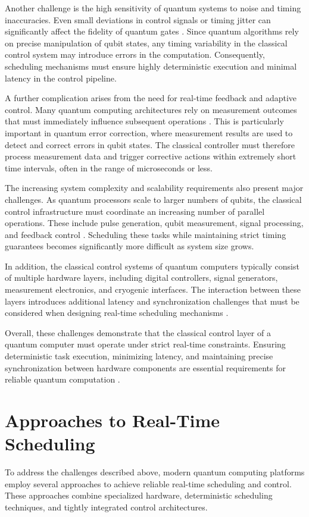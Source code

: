 \documentclass[12pt,a4paper]{article}
\begin{document}
Another challenge is the high sensitivity of quantum systems to noise and timing inaccuracies. Even small deviations in control signals or timing jitter can significantly affect the fidelity of quantum gates \cite{Salathé2018}. Since quantum algorithms rely on precise manipulation of qubit states, any timing variability in the classical control system may introduce errors in the computation. Consequently, scheduling mechanisms must ensure highly deterministic execution and minimal latency in the control pipeline.

A further complication arises from the need for real-time feedback and adaptive control. Many quantum computing architectures rely on measurement outcomes that must immediately influence subsequent operations \cite{Reuer2023}. This is particularly important in quantum error correction, where measurement results are used to detect and correct errors in qubit states. The classical controller must therefore process measurement data and trigger corrective actions within extremely short time intervals, often in the range of microseconds or less.

The increasing system complexity and scalability requirements also present major challenges. As quantum processors scale to larger numbers of qubits, the classical control infrastructure must coordinate an increasing number of parallel operations. These include pulse generation, qubit measurement, signal processing, and feedback control \cite{QPArch}. Scheduling these tasks while maintaining strict timing guarantees becomes significantly more difficult as system size grows.

In addition, the classical control systems of quantum computers typically consist of multiple hardware layers, including digital controllers, signal generators, measurement electronics, and cryogenic interfaces. The interaction between these layers introduces additional latency and synchronization challenges that must be considered when designing real-time scheduling mechanisms \cite{Reuer2023}.

Overall, these challenges demonstrate that the classical control layer of a quantum computer must operate under strict real-time constraints. Ensuring deterministic task execution, minimizing latency, and maintaining precise synchronization between hardware components are essential requirements for reliable quantum computation \cite{Salathé2018}.

\section{Approaches to Real-Time Scheduling}
To address the challenges described above, modern quantum computing platforms employ several approaches to achieve reliable real-time scheduling and control. These approaches combine specialized hardware, deterministic scheduling techniques, and tightly integrated control architectures.
\end{document}
